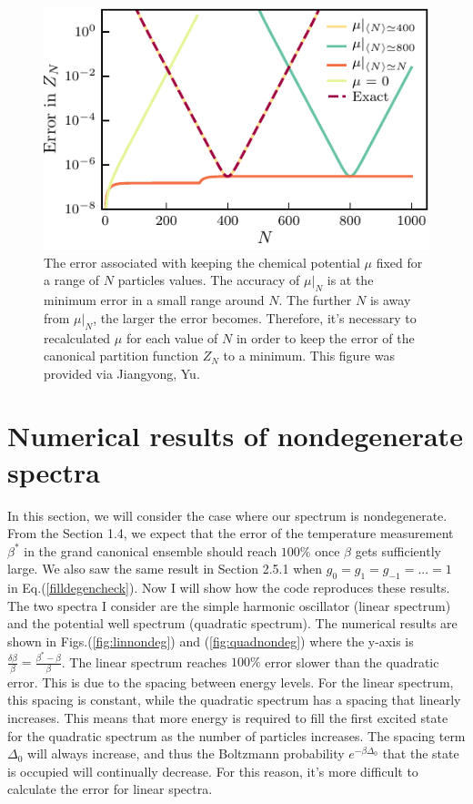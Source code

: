\begin{figure}[H]
    \centering
    \includegraphics[scale=1.25]{figures/pdf/Plot1.pdf}
    \caption{The error associated with keeping the chemical potential $\mu$ fixed for a range of $N$ particles values. The accuracy of $\mu|_N$ is at the minimum error in a small range around $N$. The further $N$ is away from $\mu|_N$, the larger the error becomes. Therefore, it's necessary to recalculated $\mu$ for each value of $N$ in order to keep the error of the canonical partition function $Z_N$ to a minimum. This figure was provided via Jiangyong, Yu. }
    \label{fig:Errors}
\end{figure}

\section{Numerical results of nondegenerate spectra}
In this section, we will consider the case where our spectrum is nondegenerate. From the Section 1.4, we expect that the error of the temperature measurement $\beta^*$ in the grand canonical ensemble should reach $100\%$ once $\beta$ gets sufficiently large. We also saw the same result in Section 2.5.1 when $g_0=g_1=g_{-1}=...=1$ in Eq.\@ (\ref{filldegencheck}). Now I will show how the code reproduces these results. The two spectra I consider are the simple harmonic oscillator (linear spectrum) and the potential well spectrum (quadratic spectrum). The numerical results are shown in Figs.\@ (\ref{fig:linnondeg}) and (\ref{fig:quadnondeg}) where the y-axis is $\frac{\delta\beta}{\beta}=\frac{\beta^*-\beta}{\beta}$. %
The linear spectrum reaches $100\%$ error slower than the quadratic error. This is due to the spacing between energy levels. For the linear spectrum, this spacing is constant, while the quadratic spectrum has a spacing that linearly increases. This means that more energy is required to fill the first excited state for the quadratic spectrum as the number of particles increases. The spacing term $\Delta_0$ will always increase, and thus the Boltzmann probability $e^{-\beta\Delta_0}$ that the state is occupied will continually decrease. For this reason, it's more difficult to calculate the error for linear spectra. 

